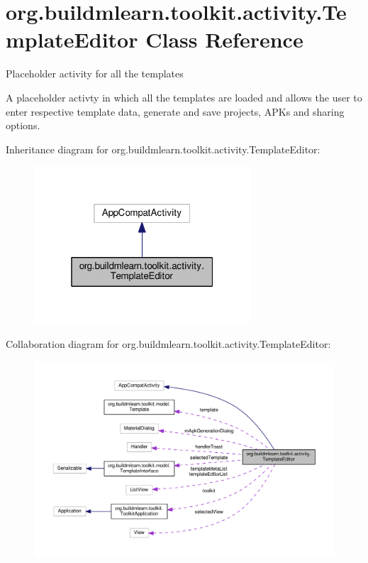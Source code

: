 \hypertarget{classorg_1_1buildmlearn_1_1toolkit_1_1activity_1_1TemplateEditor}{}\section{org.\+buildmlearn.\+toolkit.\+activity.\+Template\+Editor Class Reference}
\label{classorg_1_1buildmlearn_1_1toolkit_1_1activity_1_1TemplateEditor}


Placeholder activity for all the templates 

A placeholder activty in which all the templates are loaded and allows the user to enter respective template data, generate and save projects, A\+P\+Ks and sharing options.  




Inheritance diagram for org.\+buildmlearn.\+toolkit.\+activity.\+Template\+Editor\+:
\nopagebreak
\begin{figure}[H]
\begin{center}
\leavevmode
\includegraphics[width=229pt]{classorg_1_1buildmlearn_1_1toolkit_1_1activity_1_1TemplateEditor__inherit__graph}
\end{center}
\end{figure}


Collaboration diagram for org.\+buildmlearn.\+toolkit.\+activity.\+Template\+Editor\+:
\nopagebreak
\begin{figure}[H]
\begin{center}
\leavevmode
\includegraphics[width=350pt]{classorg_1_1buildmlearn_1_1toolkit_1_1activity_1_1TemplateEditor__coll__graph}
\end{center}
\end{figure}
